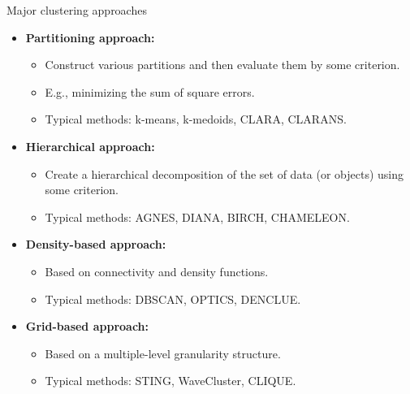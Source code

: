 \documentclass[aspectratio=169,t,xcolor=dvipsnames]{beamer}
\begin{document}
  {
    \begin{frame}{Major clustering approaches}
        \begin{itemize}
          \item \textbf{Partitioning approach:}
          \begin{itemize}
            \item Construct various partitions and then evaluate them by some criterion.
            \item E.g., minimizing the sum of square errors.
            \item Typical methods: k-means, k-medoids, CLARA, CLARANS.
          \end{itemize}
          \item \textbf{Hierarchical approach:}
          \begin{itemize}
            \item Create a hierarchical decomposition of the set of data (or objects) using some criterion.
            \item Typical methods: AGNES, DIANA, BIRCH, CHAMELEON.
          \end{itemize}
          \item \textbf{Density-based approach:}
          \begin{itemize}
            \item Based on connectivity and density functions.
            \item Typical methods: DBSCAN, OPTICS, DENCLUE.
          \end{itemize}
          \item \textbf{Grid-based approach:}
          \begin{itemize}
            \item Based on a multiple-level granularity structure.
            \item Typical methods: STING, WaveCluster, CLIQUE.
          \end{itemize}
        \end{itemize}
    \end{frame}
  }
\end{document}

